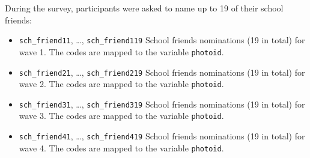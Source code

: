 \documentclass[]{book}
\theoremstyle{definition}
\theoremstyle{definition}
\theoremstyle{definition}
\theoremstyle{remark}
\begin{document}
During the survey, participants were asked to name up to 19 of their
school friends:

\begin{itemize}
\item
  \texttt{sch\_friend11}, \ldots{}, \texttt{sch\_friend119} School
  friends nominations (19 in total) for wave 1. The codes are mapped to
  the variable \texttt{photoid}.
\item
  \texttt{sch\_friend21}, \ldots{}, \texttt{sch\_friend219} School
  friends nominations (19 in total) for wave 2. The codes are mapped to
  the variable \texttt{photoid}.
\item
  \texttt{sch\_friend31}, \ldots{}, \texttt{sch\_friend319} School
  friends nominations (19 in total) for wave 3. The codes are mapped to
  the variable \texttt{photoid}.
\item
  \texttt{sch\_friend41}, \ldots{}, \texttt{sch\_friend419} School
  friends nominations (19 in total) for wave 4. The codes are mapped to
  the variable \texttt{photoid}.
\end{itemize}


\end{document}
